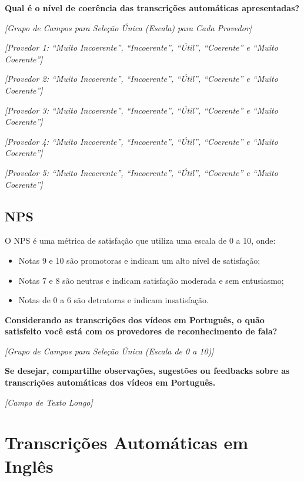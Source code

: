 \noindent
\textbf{Qual é o nível de coerência das transcrições automáticas apresentadas?}

\noindent
\textit{[Grupo de Campos para Seleção Única (Escala) para Cada Provedor]}

\noindent
\textit{[Provedor 1: ``Muito Incoerente'', ``Incoerente'', ``Útil'', ``Coerente'' e ``Muito Coerente'']}

\noindent
\textit{[Provedor 2: ``Muito Incoerente'', ``Incoerente'', ``Útil'', ``Coerente'' e ``Muito Coerente'']}

\noindent
\textit{[Provedor 3: ``Muito Incoerente'', ``Incoerente'', ``Útil'', ``Coerente'' e ``Muito Coerente'']}

\noindent
\textit{[Provedor 4: ``Muito Incoerente'', ``Incoerente'', ``Útil'', ``Coerente'' e ``Muito Coerente'']}

\noindent
\textit{[Provedor 5: ``Muito Incoerente'', ``Incoerente'', ``Útil'', ``Coerente'' e ``Muito Coerente'']}

\subsection{NPS}

\noindent
O NPS é uma métrica de satisfação que utiliza uma escala de 0 a 10, onde: 

\begin{itemize}
    \item Notas 9 e 10 são promotoras e indicam um alto nível de satisfação; 
    \item Notas 7 e 8 são neutras e indicam satisfação moderada e sem entusiasmo; 
    \item Notas de 0 a 6 são detratoras e indicam insatisfação.
\end{itemize}

\noindent
\textbf{Considerando as transcrições dos vídeos em Português, o quão satisfeito você está com os provedores de reconhecimento de fala?}

\noindent
\textit{[Grupo de Campos para Seleção Única (Escala de 0 a 10)]}

\noindent
\textbf{Se desejar, compartilhe observações, sugestões ou feedbacks sobre as transcrições automáticas dos vídeos em Português.}

\noindent
\textit{[Campo de Texto Longo]}

\section{Transcrições Automáticas em Inglês}


